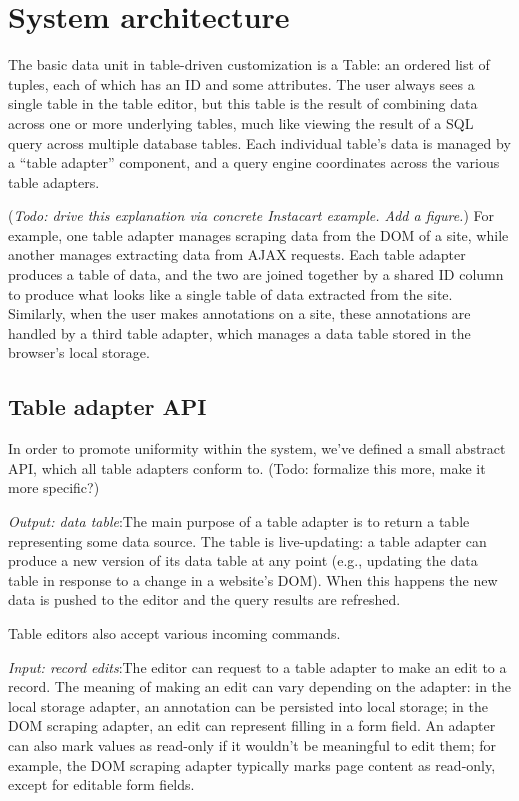 \documentclass[sigplan,10pt,anonymous,review]{acmart}
\begin{document}
\hypertarget{sec:architecture}{%
\section{System architecture}\label{sec:architecture}}

The basic data unit in table-driven customization is a Table: an ordered
list of tuples, each of which has an ID and some attributes. The user
always sees a single table in the table editor, but this table is the
result of combining data across one or more underlying tables, much like
viewing the result of a SQL query across multiple database tables. Each
individual table's data is managed by a ``table adapter'' component, and
a query engine coordinates across the various table adapters.

(\emph{Todo: drive this explanation via concrete Instacart example. Add
a figure.}) For example, one table adapter manages scraping data from
the DOM of a site, while another manages extracting data from AJAX
requests. Each table adapter produces a table of data, and the two are
joined together by a shared ID column to produce what looks like a
single table of data extracted from the site. Similarly, when the user
makes annotations on a site, these annotations are handled by a third
table adapter, which manages a data table stored in the browser's local
storage.

\hypertarget{table-adapter-api}{%
\subsection{Table adapter API}\label{table-adapter-api}}

In order to promote uniformity within the system, we've defined a small
abstract API, which all table adapters conform to. (Todo: formalize this
more, make it more specific?)

\emph{Output: data table}:The main purpose of a table adapter is to
return a table representing some data source. The table is
live-updating: a table adapter can produce a new version of its data
table at any point (e.g., updating the data table in response to a
change in a website's DOM). When this happens the new data is pushed to
the editor and the query results are refreshed.

Table editors also accept various incoming commands.

\emph{Input: record edits}:The editor can request to a table adapter to
make an edit to a record. The meaning of making an edit can vary
depending on the adapter: in the local storage adapter, an annotation
can be persisted into local storage; in the DOM scraping adapter, an
edit can represent filling in a form field. An adapter can also mark
values as read-only if it wouldn't be meaningful to edit them; for
example, the DOM scraping adapter typically marks page content as
read-only, except for editable form fields.
\end{document}
